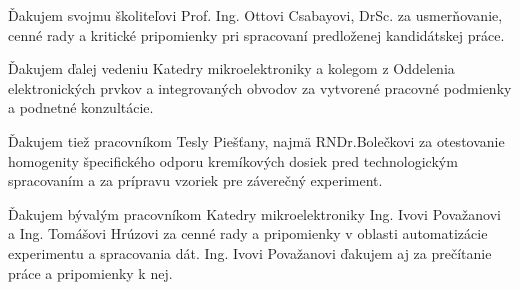 \par Ďakujem svojmu školiteľovi Prof. Ing. Ottovi Csabayovi, DrSc. za
usmerňovanie, cenné rady a kritické pripomienky pri spracovaní
predloženej kandidátskej práce.

\par Ďakujem ďalej vedeniu Katedry mikroelektroniky a kolegom z
Oddelenia elektronických prvkov a integrovaných obvodov za vytvorené
pracovné podmienky a podnetné konzultácie.

\par Ďakujem tiež pracovníkom Tesly Piešťany, najmä RNDr.Bolečkovi za
otestovanie homogenity špecifického odporu kremíkových dosiek pred
technologickým spracovaním a za prípravu vzoriek pre záverečný
experiment.

\par Ďakujem bývalým pracovníkom Katedry mikroelektroniky
Ing. Ivovi Považanovi a Ing. Tomášovi Hrúzovi za cenné rady a
pripomienky v oblasti automatizácie experimentu a spracovania
dát. Ing. Ivovi Považanovi ďakujem aj za prečítanie práce a
pripomienky k nej.
